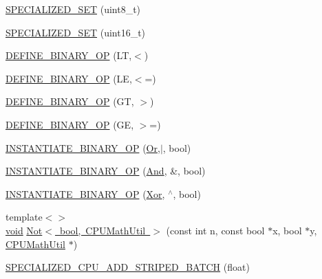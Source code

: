\begin{DoxyCompactItemize}
\item 
\mbox{\hyperlink{namespaceonnxruntime_1_1math_ab98664af57b9ef79dbc8b5dbe4722097}{S\+P\+E\+C\+I\+A\+L\+I\+Z\+E\+D\+\_\+\+S\+ET}} (uint8\+\_\+t)
\item 
\mbox{\hyperlink{namespaceonnxruntime_1_1math_a5430e386127f5830315fc75d91e11547}{S\+P\+E\+C\+I\+A\+L\+I\+Z\+E\+D\+\_\+\+S\+ET}} (uint16\+\_\+t)
\item 
\mbox{\hyperlink{namespaceonnxruntime_1_1math_a5328d5b44e7841f23fc6c9921123155b}{D\+E\+F\+I\+N\+E\+\_\+\+B\+I\+N\+A\+R\+Y\+\_\+\+OP}} (LT,$<$)
\item 
\mbox{\hyperlink{namespaceonnxruntime_1_1math_ac09da20179e9d4055d76e2959d269e2c}{D\+E\+F\+I\+N\+E\+\_\+\+B\+I\+N\+A\+R\+Y\+\_\+\+OP}} (LE,$<$=)
\item 
\mbox{\hyperlink{namespaceonnxruntime_1_1math_afeaff858435c116eea1600b5cc31cebe}{D\+E\+F\+I\+N\+E\+\_\+\+B\+I\+N\+A\+R\+Y\+\_\+\+OP}} (GT, $>$)
\item 
\mbox{\hyperlink{namespaceonnxruntime_1_1math_ac4b9e38905be95d12359c1d9cfe3ecc8}{D\+E\+F\+I\+N\+E\+\_\+\+B\+I\+N\+A\+R\+Y\+\_\+\+OP}} (GE, $>$=)
\item 
\mbox{\hyperlink{namespaceonnxruntime_1_1math_a2d38d95ed202f752a4e714591df54858}{I\+N\+S\+T\+A\+N\+T\+I\+A\+T\+E\+\_\+\+B\+I\+N\+A\+R\+Y\+\_\+\+OP}} (\mbox{\hyperlink{classonnxruntime_1_1Or}{Or}},$\vert$, bool)
\item 
\mbox{\hyperlink{namespaceonnxruntime_1_1math_a15e1a2930ed8097efda5f007037633eb}{I\+N\+S\+T\+A\+N\+T\+I\+A\+T\+E\+\_\+\+B\+I\+N\+A\+R\+Y\+\_\+\+OP}} (\mbox{\hyperlink{classonnxruntime_1_1And}{And}}, \&, bool)
\item 
\mbox{\hyperlink{namespaceonnxruntime_1_1math_af0e97d0d77ce88d2c12cffcfed1197d5}{I\+N\+S\+T\+A\+N\+T\+I\+A\+T\+E\+\_\+\+B\+I\+N\+A\+R\+Y\+\_\+\+OP}} (\mbox{\hyperlink{classonnxruntime_1_1Xor}{Xor}}, $^\wedge$, bool)
\item 
{\footnotesize template$<$$>$ }\\\mbox{\hyperlink{mlasi_8h_a88f941d423cb2a819b70a1358982b1a6}{void}} \mbox{\hyperlink{namespaceonnxruntime_1_1math_acedd20955c9a52f9e7e60517ef35fc79}{Not$<$ bool, C\+P\+U\+Math\+Util $>$}} (const int n, const bool $\ast$x, bool $\ast$y, \mbox{\hyperlink{classonnxruntime_1_1CPUMathUtil}{C\+P\+U\+Math\+Util}} $\ast$)
\item 
\mbox{\hyperlink{namespaceonnxruntime_1_1math_adc64114fca61b95498260e9e8be7ab3a}{S\+P\+E\+C\+I\+A\+L\+I\+Z\+E\+D\+\_\+\+C\+P\+U\+\_\+\+A\+D\+D\+\_\+\+S\+T\+R\+I\+P\+E\+D\+\_\+\+B\+A\+T\+CH}} (float)

\end{DoxyCompactItemize}
